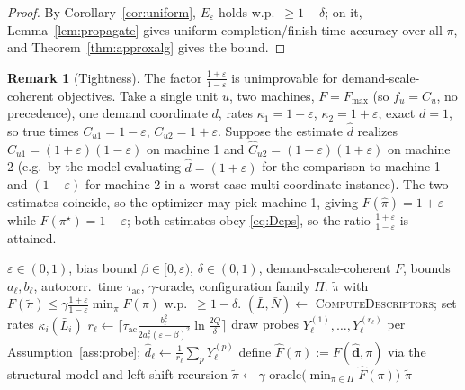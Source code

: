 \documentclass{amsart}
\theoremstyle{definition}
\newtheorem{remark}{Remark}
\begin{document}
\begin{proof}
By Corollary~\ref{cor:uniform}, $E_\varepsilon$ holds w.p.\ $\ge1-\delta$; on it,
Lemma~\ref{lem:propagate} gives uniform completion/finish-time accuracy over all
$\pi$, and Theorem~\ref{thm:approxalg} gives the bound.
\end{proof}

\begin{remark}[Tightness]\label{rem:tight}
The factor $\frac{1+\varepsilon}{1-\varepsilon}$ is unimprovable for
demand-scale-coherent objectives. Take a single unit $u$, two machines, $F=F_{\max}$
(so $f_u=C_u$, no precedence), one demand coordinate $d$, rates
$\kappa_1=1-\varepsilon$, $\kappa_2=1+\varepsilon$, exact $d=1$, so true times
$C_{u1}=1-\varepsilon$, $C_{u2}=1+\varepsilon$. Suppose the estimate
$\widehat d$ realizes $\widehat C_{u1}=(1+\varepsilon)(1-\varepsilon)$ on machine
1 and $\widehat C_{u2}=(1-\varepsilon)(1+\varepsilon)$ on machine 2 (e.g.\ by the
model evaluating $\widehat d=(1+\varepsilon)$ for the comparison to machine 1 and
$(1-\varepsilon)$ for machine 2 in a worst-case multi-coordinate instance). The
two estimates coincide, so the optimizer may pick machine 1, giving
$F(\hat\pi)=1+\varepsilon$ while $F(\pi^\star)=1-\varepsilon$; both estimates obey
\eqref{eq:Deps}, so the ratio $\frac{1+\varepsilon}{1-\varepsilon}$ is attained.
\end{remark}

\begin{algorithm}[h]
\caption{EstimatedOptimalMapping}\label{alg:map}
\begin{algorithmic}[1]
\Require $\varepsilon\in(0,1)$, bias bound $\beta\in[0,\varepsilon)$, $\delta\in(0,1)$, demand-scale-coherent $F$, bounds $a_\ell,b_\ell$, autocorr.\ time $\tau_{\mathrm{ac}}$, $\gamma$-oracle, configuration family $\Pi$.
\Ensure $\tilde\pi$ with $F(\tilde\pi)\le\gamma\frac{1+\varepsilon}{1-\varepsilon}\min_\pi F(\pi)$ w.p.\ $\ge1-\delta$.
\State $(\bar L,\bar N)\gets$ \textsc{ComputeDescriptors}; set rates $\kappa_i(\bar L_i)$
  \State $r_\ell\gets\big\lceil \tau_{\mathrm{ac}}\frac{b_\ell^2}{2a_\ell^2(\varepsilon-\beta)^2}\ln\frac{2Q}{\delta}\big\rceil$
  \State draw probes $Y^{(1)}_\ell,\dots,Y^{(r_\ell)}_\ell$ per Assumption~\ref{ass:probe}; $\widehat d_\ell\gets\frac1{r_\ell}\sum_p Y^{(p)}_\ell$
\EndFor
\State define $\widehat F(\pi):=F(\widehat{\mathbf d},\pi)$ via the structural model and left-shift recursion
\State $\tilde\pi\gets\gamma$-oracle$\big(\min_{\pi\in\Pi}\widehat F(\pi)\big)$
\State \Return $\tilde\pi$
\end{algorithmic}
\end{algorithm}
\end{document}
